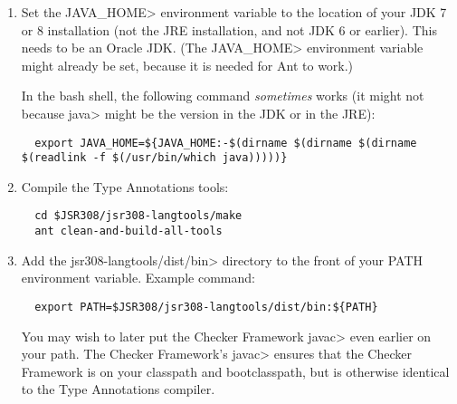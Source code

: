 \begin{enumerate}
\item
Set the \<JAVA\_HOME> environment variable to the location of your JDK 
7 or 8 installation (not the JRE installation, and not JDK 6 or earlier).
This needs to be an Oracle JDK.
(The \<JAVA\_HOME> environment
variable might already be set, because it is needed for Ant to work.)

In the bash shell, the following command \emph{sometimes} works (it might
not because \<java> might be the version in the JDK or in the JRE):
\begin{Verbatim}
  export JAVA_HOME=${JAVA_HOME:-$(dirname $(dirname $(dirname $(readlink -f $(/usr/bin/which java)))))}
\end{Verbatim}

\item
Compile the Type Annotations tools:

\begin{Verbatim}
  cd $JSR308/jsr308-langtools/make
  ant clean-and-build-all-tools
\end{Verbatim}

\item
 Add the \<jsr308-langtools/dist/bin> directory to the front of your PATH environment variable.
  Example command:

\begin{Verbatim}
  export PATH=$JSR308/jsr308-langtools/dist/bin:${PATH}
\end{Verbatim}

You may wish to later put the Checker Framework \<javac> even earlier on
your path.  The Checker Framework's \<javac> ensures that the Checker
Framework is on your classpath and bootclasspath, but is otherwise
identical to the Type Annotations compiler.

\end{enumerate}




